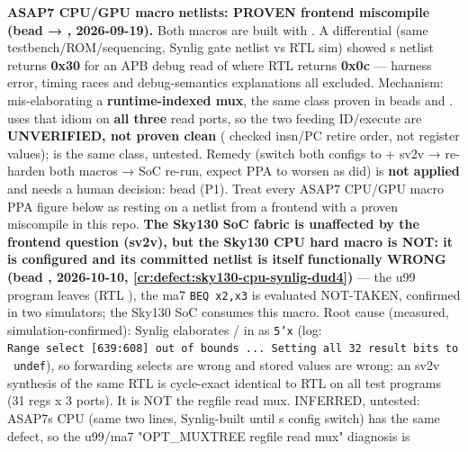 \begin{record}
\bad{} \textbf{ASAP7 CPU/GPU macro netlists: PROVEN frontend miscompile
(bead  → , 2026-09-19).} Both macros are built with
. A differential (same
testbench/\allowbreak{}ROM/\allowbreak{}sequencing, Synlig gate netlist
vs RTL sim) showed \textquotesingle s netlist
returns \textbf{0x30} for an APB debug read of  where
RTL returns \textbf{0x0c} --- harness error, timing races and
debug-semantics explanations all excluded. Mechanism: 
mis-elaborating a \textbf{runtime-indexed mux}, the same class proven in
beads  and . 
uses that idiom on \textbf{all three} read ports, so the two feeding
ID/\allowbreak{}execute are \textbf{UNVERIFIED, not proven clean}
( checked insn/PC retire order, not register values);
 is the same class, untested. Remedy
(switch both configs to  + sv2v → re-harden both
macros → SoC re-run, expect PPA to worsen as  did) is
\textbf{not applied} and needs a human decision: bead  (P1).
Treat every ASAP7 CPU/GPU macro PPA figure below as resting on a netlist
from a frontend with a proven miscompile in this repo. \textbf{The
Sky130 SoC fabric is unaffected by the frontend question (sv2v), but the
Sky130 CPU hard macro is NOT: it is configured 
and its committed netlist
 is itself functionally
WRONG (bead , 2026-10-10,
\cref{cr:defect:sky130-cpu-synlig-dud4})} --- the u99 program leaves
 (RTL ), the ma7
\texttt{BEQ\ x2,\allowbreak{}x3} is evaluated NOT-TAKEN, confirmed in
two simulators; the Sky130 SoC consumes this macro. Root cause
(measured, simulation-confirmed): Synlig elaborates
 /
 in 
 as \texttt{5'x} (log:
\texttt{Range\ select\ [639:\allowbreak{}608]\ out\ of\ bounds\ .\allowbreak{}.\allowbreak{}.\allowbreak{}\ Setting\ all\ 32\ result\ bits\ to\ undef}),
so forwarding selects are wrong and stored values are wrong; an sv2v
synthesis of the same RTL is cycle-exact identical to RTL on all test
programs (31 regs x 3 ports). It is NOT the regfile read mux. INFERRED,
untested: ASAP7\textquotesingle s CPU (same two lines, Synlig-built
until \textquotesingle s config switch) has the same defect,
so the u99/ma7 "OPT\_\allowbreak{}MUXTREE regfile read mux" diagnosis is

\end{record}
